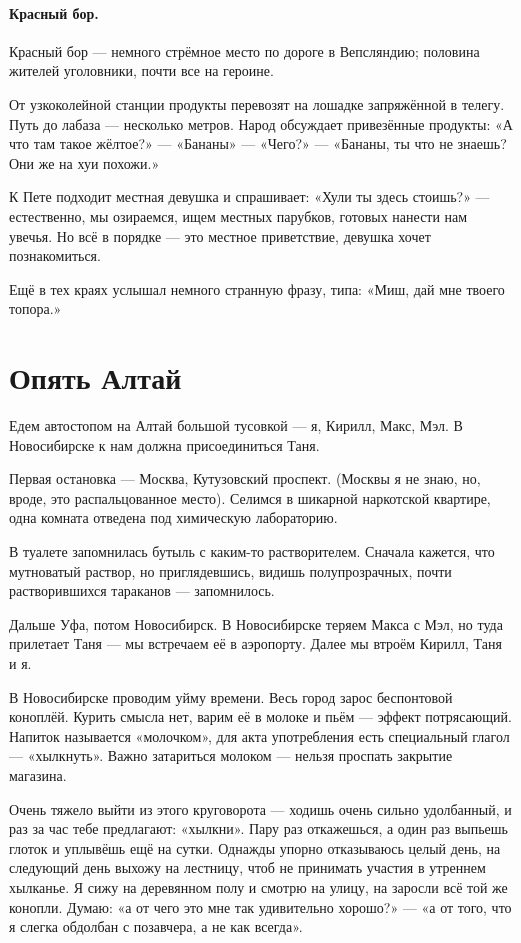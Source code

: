 \documentclass{book}
\begin{document}
\paragraph{Красный бор.}
Красный бор --- немного стрёмное место по дороге в Вепсляндию;
половина жителей уголовники, почти все на героине.

От узкоколейной станции продукты перевозят на лошадке запряжённой в телегу.
Путь до лабаза --- несколько метров.
Народ обсуждает привезённые продукты: «А что там такое жёлтое?» --- «Бананы» --- «Чего?» --- «Бананы, ты что не знаешь? Они же на хуи похожи.»

К Пете подходит местная девушка и спрашивает: «Хули ты здесь стоишь?» --- естественно, мы озираемся, ищем местных парубков, готовых нанести нам увечья.
Но всё в порядке --- это местное приветствие, девушка хочет познакомиться.

Ещё в тех краях услышал немного странную фразу, типа: «Миш, дай мне твоего топора.»

\section*{Опять Алтай}

Едем автостопом на Алтай большой тусовкой --- я, Кирилл, Макс, Мэл.
В Новосибирске к нам должна присоединиться Таня.

Первая остановка --- Москва, Кутузовский проспект.
(Москвы я не знаю, но, вроде, это распальцованное место).
Селимся в шикарной наркотской квартире, одна комната отведена под химическую лабораторию.

В туалете запомнилась бутыль с каким-то растворителем.
Сначала кажется, что мутноватый раствор, но приглядевшись, видишь полупрозрачных, почти растворившихся тараканов --- запомнилось.

Дальше Уфа, потом Новосибирск.
В Новосибирске теряем Макса с Мэл, но туда прилетает Таня --- мы встречаем её в аэропорту.
Далее мы втроём Кирилл, Таня и я.

В Новосибирске проводим уйму времени.
Весь город зарос беспонтовой коноплёй.
Курить смысла нет,
варим её в молоке и пьём --- эффект потрясающий.
Напиток называется «молочком», для акта употребления есть специальный глагол --- «хылкнуть».
Важно затариться молоком --- нельзя проспать закрытие магазина.

Очень тяжело выйти из этого круговорота --- ходишь очень сильно удолбанный, и раз за час тебе предлагают: «хылкни».
Пару раз откажешься, а один раз выпьешь глоток и уплывёшь ещё на сутки.
Однажды упорно отказываюсь целый день, на следующий день выхожу на лестницу, чтоб не принимать участия в утреннем хылканье.
Я сижу на деревянном полу и смотрю на улицу, на заросли всё той же конопли.
Думаю: «а от чего это мне так удивительно хорошо?» --- «а от того, что я слегка обдолбан с позавчера, а не как всегда».
\end{document}
